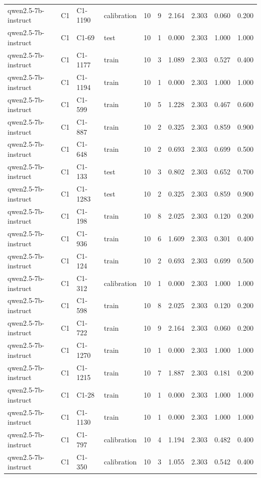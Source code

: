\begin{table}
\begin{tabular}{llllrrrrrr}
qwen2.5-7b-instruct & C1 & C1-1190 & calibration & 10 & 9 & 2.164 & 2.303 & 0.060 & 0.200 \\
qwen2.5-7b-instruct & C1 & C1-69 & test & 10 & 1 & 0.000 & 2.303 & 1.000 & 1.000 \\
qwen2.5-7b-instruct & C1 & C1-1177 & train & 10 & 3 & 1.089 & 2.303 & 0.527 & 0.400 \\
qwen2.5-7b-instruct & C1 & C1-1194 & train & 10 & 1 & 0.000 & 2.303 & 1.000 & 1.000 \\
qwen2.5-7b-instruct & C1 & C1-599 & train & 10 & 5 & 1.228 & 2.303 & 0.467 & 0.600 \\
qwen2.5-7b-instruct & C1 & C1-887 & train & 10 & 2 & 0.325 & 2.303 & 0.859 & 0.900 \\
qwen2.5-7b-instruct & C1 & C1-648 & train & 10 & 2 & 0.693 & 2.303 & 0.699 & 0.500 \\
qwen2.5-7b-instruct & C1 & C1-133 & test & 10 & 3 & 0.802 & 2.303 & 0.652 & 0.700 \\
qwen2.5-7b-instruct & C1 & C1-1283 & test & 10 & 2 & 0.325 & 2.303 & 0.859 & 0.900 \\
qwen2.5-7b-instruct & C1 & C1-198 & train & 10 & 8 & 2.025 & 2.303 & 0.120 & 0.200 \\
qwen2.5-7b-instruct & C1 & C1-936 & train & 10 & 6 & 1.609 & 2.303 & 0.301 & 0.400 \\
qwen2.5-7b-instruct & C1 & C1-124 & train & 10 & 2 & 0.693 & 2.303 & 0.699 & 0.500 \\
qwen2.5-7b-instruct & C1 & C1-312 & calibration & 10 & 1 & 0.000 & 2.303 & 1.000 & 1.000 \\
qwen2.5-7b-instruct & C1 & C1-598 & train & 10 & 8 & 2.025 & 2.303 & 0.120 & 0.200 \\
qwen2.5-7b-instruct & C1 & C1-722 & train & 10 & 9 & 2.164 & 2.303 & 0.060 & 0.200 \\
qwen2.5-7b-instruct & C1 & C1-1270 & train & 10 & 1 & 0.000 & 2.303 & 1.000 & 1.000 \\
qwen2.5-7b-instruct & C1 & C1-1215 & train & 10 & 7 & 1.887 & 2.303 & 0.181 & 0.200 \\
qwen2.5-7b-instruct & C1 & C1-28 & train & 10 & 1 & 0.000 & 2.303 & 1.000 & 1.000 \\
qwen2.5-7b-instruct & C1 & C1-1130 & train & 10 & 1 & 0.000 & 2.303 & 1.000 & 1.000 \\
qwen2.5-7b-instruct & C1 & C1-797 & calibration & 10 & 4 & 1.194 & 2.303 & 0.482 & 0.400 \\
qwen2.5-7b-instruct & C1 & C1-350 & calibration & 10 & 3 & 1.055 & 2.303 & 0.542 & 0.400 \\

\end{tabular}
\end{table}
